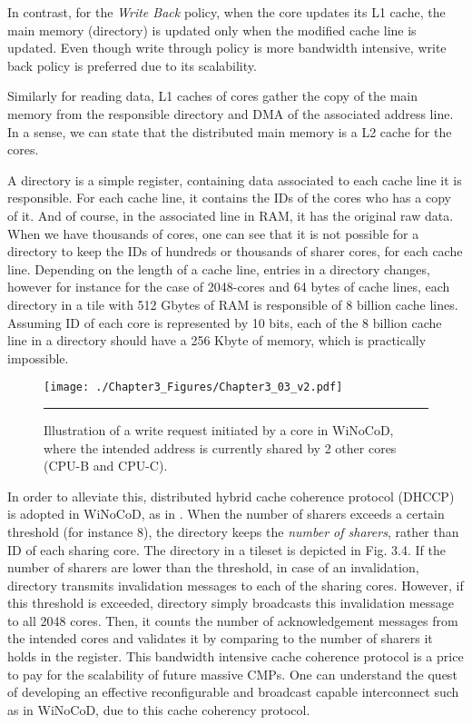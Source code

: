 In contrast, for the \textit{Write Back} policy, when the core updates its L1 cache, the main memory (directory) is updated only when the modified cache line is updated. Even though write through policy is more bandwidth intensive, write back policy is preferred due to its scalability.

Similarly for reading data, L1 caches of cores gather the copy of the main memory from the responsible directory and DMA of the associated address line. In a sense, we can state that the distributed main memory is a L2 cache for the cores.

A directory is a simple register, containing data associated to each cache line it is responsible. For each cache line, it contains the IDs of the cores who has a copy of it. And of course, in the associated line in RAM, it has the original raw data. When we have thousands of cores, one can see that it is not possible for a directory to keep the IDs of hundreds or thousands of sharer cores, for each cache line. Depending on the length of a cache line, entries in a directory changes, however for instance for the case of 2048-cores and 64 bytes of cache lines, each directory in a tile with 512 Gbytes of RAM is responsible of 8 billion cache lines. Assuming ID of each core is represented by 10 bits, each of the 8 billion cache line in a directory should have a 256 Kbyte of memory, which is practically impossible.

\begin{figure}[htbp]
  \centering
    \texttt{[image: ./Chapter3\_Figures/Chapter3\_03\_v2.pdf]}
    \rule{35em}{0.5pt}
  \caption[Illustration of a write request initiated by CPU-A in WiNoCoD, where the intended address is currently shared by 2 other cores.]{Illustration of a write request initiated by a core in WiNoCoD, where the intended address is currently shared by 2 other cores (CPU-B and CPU-C).}
  \label{fig:Electron}
\end{figure}

In order to alleviate this, distributed hybrid cache coherence protocol (DHCCP) is adopted in WiNoCoD, as in \cite{greiner2009tsar}\cite{kurian2010atac}. When the number of sharers exceeds a certain threshold (for instance 8), the directory keeps the \textit{number of sharers}, rather than ID of each sharing core. The directory in a tileset is depicted in Fig. 3.4. If the number of sharers are lower than the threshold, in case of an invalidation, directory transmits invalidation messages to each of the sharing cores. However, if this threshold is exceeded, directory simply broadcasts this invalidation message to all 2048 cores. Then, it counts the number of acknowledgement messages from the intended cores and validates it by comparing to the number of sharers it holds in the register. This bandwidth intensive cache coherence protocol is a price to pay for the scalability of future massive CMPs. One can understand the quest of developing an effective reconfigurable and broadcast capable interconnect such as in WiNoCoD, due to this cache coherency protocol. 
   
